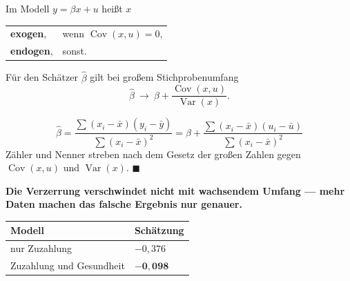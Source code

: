 \begin{definition}
Im Modell $y = \beta x + u$ heißt $x$
\begin{center}
{\small
\renewcommand{\arraystretch}{1.5}
\begin{tabular}{@{}P{2.4cm}P{6.0cm}@{}}
\toprule
\textbf{exogen}, & wenn $\operatorname{Cov}(x,u) = 0$,\\
\textbf{endogen}, & sonst.\\
\bottomrule
\end{tabular}}
\end{center}
\end{definition}

\begin{merksatz}
Für den Schätzer $\hat\beta$ gilt bei großem Stichprobenumfang
\[ \hat\beta \ \longrightarrow\ \beta + \frac{\operatorname{Cov}(x,u)}{\operatorname{Var}(x)} . \]

\[ \hat\beta = \frac{\sum (x_i-\bar x)(y_i-\bar y)}{\sum(x_i-\bar x)^{2}} = \beta + \frac{\sum(x_i-\bar x)(u_i-\bar u)}{\sum(x_i-\bar x)^{2}} \]
Zähler und Nenner streben nach dem Gesetz der großen Zahlen gegen $\operatorname{Cov}(x,u)$ und $\operatorname{Var}(x)$. $\blacksquare$

\begin{center}
\begin{minipage}{0.9\textwidth}
\textbf{Die Verzerrung verschwindet nicht mit wachsendem Umfang --- mehr Daten machen das falsche Ergebnis nur genauer.}
\end{minipage}
\end{center}

\begin{center}
\begin{minipage}{0.88\textwidth}
\end{minipage}
\end{center}

\begin{center}
{\small
\renewcommand{\arraystretch}{1.48}
\begin{tabular}{@{}P{3.4cm}P{2.6cm}@{}}
\toprule
\textbf{Modell} & \textbf{Schätzung}\\
\midrule
nur Zuzahlung & $-0{,}376$\\
Zuzahlung und Gesundheit & $\mathbf{-0{,}098}$\\
\bottomrule
\end{tabular}}
\end{center}

\end{merksatz}

